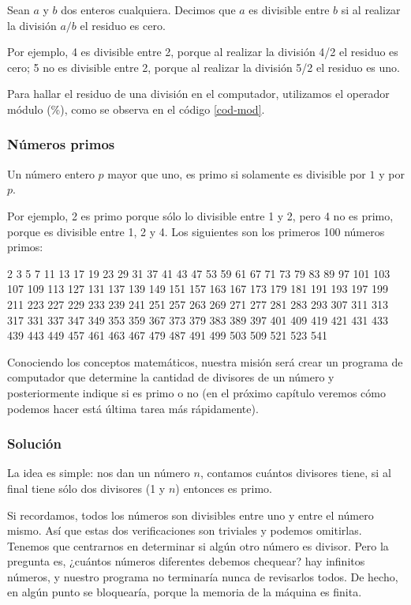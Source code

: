 Sean $a$ y $b$ dos enteros cualquiera. Decimos que $a$ es divisible entre $b$ si al realizar la división $a/b$ el residuo es cero.

Por ejemplo, 4 es divisible entre 2, porque al realizar la división 4/2 el residuo es cero; 5 no es divisible entre 2, porque al realizar la división 5/2 el residuo es uno.

Para hallar el residuo de una división en el computador, utilizamos el operador módulo (\%), como se observa en el código \ref{cod-mod}. \\





\subsubsection{Números primos}

Un número entero $p$ mayor que uno, es  primo si solamente es divisible por $1$ y por $p$.  

Por ejemplo, 2 es primo porque sólo lo divisible entre 1 y 2, pero 4 no es primo, porque es divisible entre 1, 2 y 4. Los siguientes son los primeros 100 números primos:

2 3 5 7 11 13 17 19 23 29 31 37 41 43 47 53 59 61 67 71 73 79 83 89 97 101 103 107 109 113 127 131 137 139 149 151 157 163 167 173 179 181 191 193 197 199 211 223 227 229 233 239 241 251 257 263 269 271 277 281 283 293 307 311 313 317 331 337 347 349 353 359 367 373 379 383 389 397 401 409 419 421 431 433 439 443 449 457 461 463 467 479 487 491 499 503 509 521 523 541 

Conociendo los conceptos matemáticos, nuestra misión será crear un programa de computador que determine la cantidad de divisores de un número y posteriormente indique si es primo o no (en el próximo capítulo veremos cómo podemos hacer está última tarea más rápidamente).

\subsubsection{Solución}

La idea es simple: nos dan un número $n$, contamos cuántos divisores tiene, si al final tiene sólo dos divisores (1 y $n$) entonces es primo.

Si recordamos, todos los números son divisibles entre uno y entre el número mismo. Así que estas dos verificaciones son triviales y podemos omitirlas. Tenemos que centrarnos en determinar si algún otro número es divisor. Pero la pregunta es, ¿cuántos números diferentes debemos chequear? hay infinitos números, y nuestro programa no terminaría nunca de revisarlos todos. De hecho, en algún punto se bloquearía, porque la memoria de la máquina es finita. 

